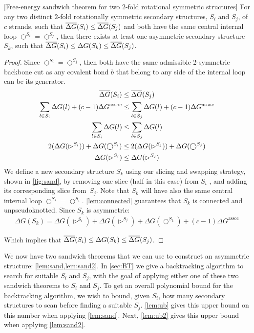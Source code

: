 \begin{lemma}\label{lem:sand2}[Free-energy sandwich theorem for two $2$-fold rotational symmetric structures]
	For any two distinct  $2$-fold rotationally symmetric secondary structures, $S_i$ and $S_j$, of $c$ strands, such that $\overline{\Delta G}(S_i) \leq \overline{\Delta G}(S_j)$ and both have the same central internal loop $\bigcirc^{S_i} = \bigcirc^{S_j}$, then there exists at least one asymmetric secondary structure $S_k$, such that $\overline{\Delta G}(S_i) \leq \Delta G(S_k) \leq \overline{\Delta G}(S_j)$.  
\end{lemma}
\begin{proof}
	Since $\bigcirc^{S_i} = \bigcirc^{S_j}$,  then both have the same admissible 2-symmetric backbone cut as any covalent bond $b$ that belong to any side of the internal loop can be its generator.
	\begin{gather*}
		\overline{\Delta G}(S_i) \leq \overline{\Delta G}(S_j)
		\\
		\sum_{l\in S_i} \Delta G(l)
		+  (c-1)\Delta G^{\textrm{assoc}} \leq \sum_{l\in S_j} \Delta G(l)
		+  (c-1)\Delta G^{\textrm{assoc}}
		\\
		\sum_{l\in S_i} \Delta G(l)
		\leq \sum_{l\in S_j} \Delta G(l)
		\\
		2(\Delta G(\rhd^{S_i}))+ \Delta G(\bigcirc^{S_i})
		\leq 2(\Delta G(\rhd^{S_j}))+ \Delta G(\bigcirc^{S_j})
		\\
		\Delta G(\rhd^{S_i})
		\leq \Delta G(\rhd^{S_j})
	\end{gather*}	
	We define a new secondary structure $S_k$ using our slicing and swapping strategy, shown in \cref{fig:sand}, by removing one slice  (half in this case) from $S_i$ , and adding its corresponding slice from~$S_j$. 
	Note that $S_k$ will have also the same central internal loop $\bigcirc^{S_k}= \bigcirc^{S_i}$. \cref{lem:connected} guarantees that $S_k$ is connected and unpseudoknotted. Since $S_k$ is asymmetric: 
	\begin{gather*}
		\Delta G(S_k) = \Delta G(\rhd^{S_i}) +\Delta G(\rhd^{S_j}) + \Delta G(\bigcirc^{S_k}) + (c-1)\Delta G^{\textrm{assoc}}
	\end{gather*}
	
	Which implies that $\overline{\Delta G}(S_i) \leq \Delta G(S_k) \leq \overline{\Delta G}(S_j)$. 
\end{proof}

We now have two sandwich theorems that we can use to construct an asymmetric structure: \cref{lem:sand,lem:sand2}. In \cref{sec:BT} we give a backtracking algorithm to search for suitable $S_i$ and $S_j$, with the goal of  applying either one of these two sandwich theorems to $S_i$ and $S_j$. 
To get an overall polynomial bound for the backtracking algorithm, we wish to bound, given $S_i$, how many secondary structures to scan before finding a suitable $S_j$.    
\cref{lem:ub} gives this upper bound on this number  when applying \cref{lem:sand}. 
Next, \cref{lem:ub2} gives this upper bound  when applying  \cref{lem:sand2}. 

